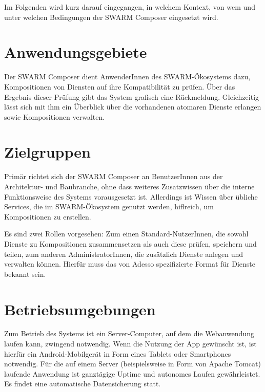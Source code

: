 Im Folgenden wird kurz darauf eingegangen, in welchem Kontext, von wem und unter welchen Bedingungen der SWARM Composer eingesetzt wird.

\section*{Anwendungsgebiete}
Der SWARM Composer dient AnwenderInnen des SWARM-Ökosystems dazu, Kompositionen von Diensten auf ihre Kompatibilität zu prüfen. Über das Ergebnis dieser Prüfung gibt das System grafisch eine Rückmeldung. Gleichzeitig lässt sich mit ihm ein Überblick über die vorhandenen atomaren Dienste erlangen sowie Kompositionen verwalten. 

\section*{Zielgruppen}

Primär richtet sich der SWARM Composer an BenutzerInnen aus der Architektur- und Baubranche, ohne dass weiteres Zusatzwissen über die interne Funktionsweise des Systems vorausgesetzt ist. Allerdings ist Wissen über übliche Services, die im SWARM-Ökosystem genutzt werden, hiflreich, um Kompositionen zu erstellen.

Es sind zwei Rollen vorgesehen: Zum einen Standard-NutzerInnen, die sowohl Dienste zu Kompositionen zusammensetzen als auch diese prüfen, speichern und teilen, zum anderen AdministratorInnen, die zusätzlich Dienste anlegen und verwalten können. Hierfür muss das von Adesso spezifizierte Format für Dienste bekannt sein.

\section*{Betriebsumgebungen}

Zum Betrieb des Systems ist ein Server-Computer, auf dem die Webanwendung laufen kann, zwingend notwendig. Wenn die Nutzung der App gewünscht ist, ist hierfür ein Android-Mobilgerät in Form eines Tablets oder Smartphones notwendig. Für die auf einem Server (beispielsweise in Form von Apache Tomcat) laufende Anwendung ist ganztägige Uptime und autonomes Laufen gewährleistet. Es findet eine automatische Datensicherung statt.




